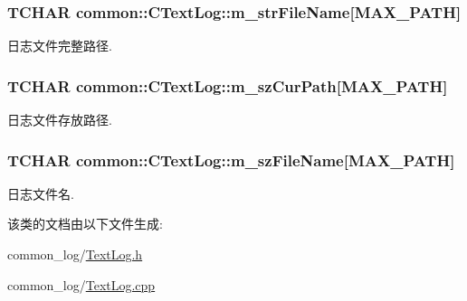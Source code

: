 \hypertarget{classcommon_1_1_c_text_log_a1e17cd173b1b0f1fe7dcd68a2dbdbe34}{
\subsubsection[{m\+\_\+str\+File\+Name}]{\setlength{\rightskip}{0pt plus 5cm}T\+C\+H\+A\+R common\+::\+C\+Text\+Log\+::m\+\_\+str\+File\+Name\mbox{[}M\+A\+X\+\_\+\+P\+A\+T\+H\mbox{]}\hspace{0.3cm}{\ttfamily [private]}}}\label{classcommon_1_1_c_text_log_a1e17cd173b1b0f1fe7dcd68a2dbdbe34}


日志文件完整路径. 

\hypertarget{classcommon_1_1_c_text_log_aca6715190bbbdc7f30a28c71b808db3d}{
\subsubsection[{m\+\_\+sz\+Cur\+Path}]{\setlength{\rightskip}{0pt plus 5cm}T\+C\+H\+A\+R common\+::\+C\+Text\+Log\+::m\+\_\+sz\+Cur\+Path\mbox{[}M\+A\+X\+\_\+\+P\+A\+T\+H\mbox{]}\hspace{0.3cm}{\ttfamily [private]}}}\label{classcommon_1_1_c_text_log_aca6715190bbbdc7f30a28c71b808db3d}


日志文件存放路径. 

\hypertarget{classcommon_1_1_c_text_log_a05e97e2cd0b36c02f51a2affd016acbb}{
\subsubsection[{m\+\_\+sz\+File\+Name}]{\setlength{\rightskip}{0pt plus 5cm}T\+C\+H\+A\+R common\+::\+C\+Text\+Log\+::m\+\_\+sz\+File\+Name\mbox{[}M\+A\+X\+\_\+\+P\+A\+T\+H\mbox{]}\hspace{0.3cm}{\ttfamily [private]}}}\label{classcommon_1_1_c_text_log_a05e97e2cd0b36c02f51a2affd016acbb}


日志文件名. 



该类的文档由以下文件生成\+:\begin{DoxyCompactItemize}
\item 
common\+\_\+log/\hyperlink{_text_log_8h}{Text\+Log.\+h}\item 
common\+\_\+log/\hyperlink{_text_log_8cpp}{Text\+Log.\+cpp}\end{DoxyCompactItemize}
